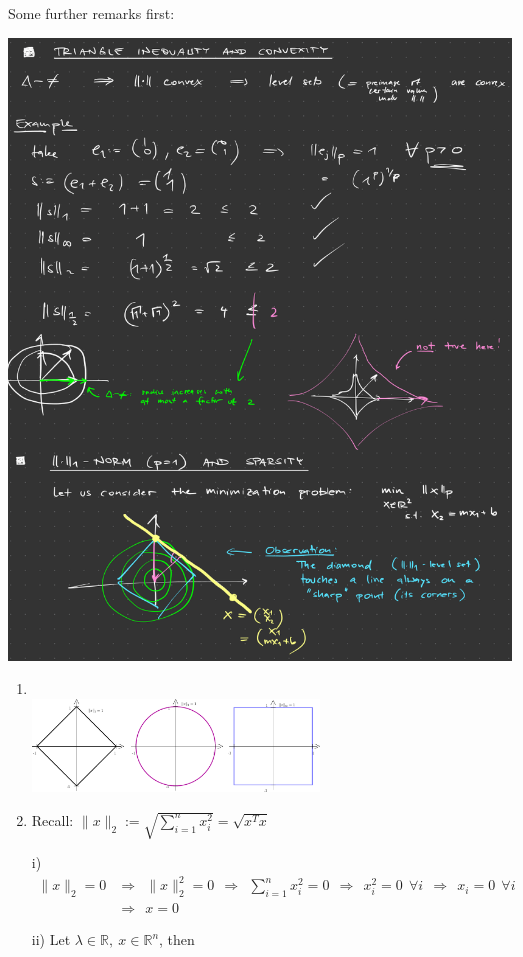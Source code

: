 {
	Some further remarks first:\\
	\begin{center}
		\includegraphics[width=0.8\linewidth]{ex-pNorms-notes}
	\end{center}
\color{solution}
\begin{enumerate}
		\item~\\  \includegraphics[width=0.6\textwidth]{norms.pdf}
		\item Recall: $\|{x}\|_2:=\sqrt{\sum_{i=1}^{n}x_i^2}=\sqrt{x^Tx}$
		\item[i)] 
		\begin{align*} 
		\|{x}\|_2 =0&\Rightarrow \ \ \|{x}\|_2^2 = 0\ \ \Rightarrow\ \ \sum_{i=1}^{n}x_i^2=0\ \ \Rightarrow\ \ x_i^2=0\ \ \forall i\ \ \Rightarrow\ \ x_i=0\ \ \forall i\\
		&\Rightarrow\ \ x=0
		\end{align*}
		\item[ii)] 
		Let $\lambda\in\mathbb{R},\ x\in\mathbb{R}^n$, then
		\begin{align*}

\end{align*}
\end{enumerate}}
